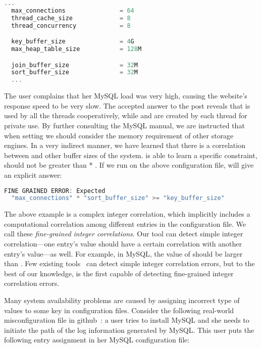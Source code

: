 \begin{lstlisting}[language=C, xleftmargin=.01\textwidth]
  ...
  max_connections               = 64
  thread_cache_size             = 8
  thread_concurrency            = 8

  key_buffer_size               = 4G
  max_heap_table_size           = 128M

  join_buffer_size              = 32M
  sort_buffer_size              = 32M    
  ...
\end{lstlisting} 

The user complains that her MySQL load was very high, 
causing the website's response speed to be very slow.
The accepted answer to the post reveals that  
is used by all the threads cooperatively, 
while  and  are created 
by each thread for private use.
By further consulting the MySQL manual, 
we are instructed that when setting  we should consider the memory requirement of other storage engines.
In a very indirect manner, we have learned that there is a correlation
between  and other buffer sizes of the system.
\app is able to learn a specific constraint, \ie
{} should not be greater than
 * .
If we run \app on the above configuration file, \app will give an explicit answer:

\begin{lstlisting}[language=C, xleftmargin=.01\textwidth]
FINE GRAINED ERROR: Expected 
  "max_connections" * "sort_buffer_size" >= "key_buffer_size"
\end{lstlisting} 

The above example is a complex integer correlation, which implicitly
includes a computational correlation among different entries
in the configuration file.
We call these {\em fine-grained integer correlations}. 
Our tool can detect simple integer correlation---one entry's
value should have a certain correlation with another entry's 
value---as well.
For example, in MySQL, the value of  
should be larger than .
Few existing tools~\cite{yin11anempirical, zhang14encore}
can detect simple integer correlation errors,
but to the best of our knowledge, \app is the first capable of
detecting fine-grained integer correlation errors.

Many system availability problems are caused by 
assigning incorrect type of values to some key in configuration
files. Consider the following real-world misconfiguration
file in github~\cite{typeerror}:
a user tries to install MySQL and she needs to initiate the path
of the log information generated by MySQL.
This user puts the following entry assignment in her MySQL
configuration file: 

